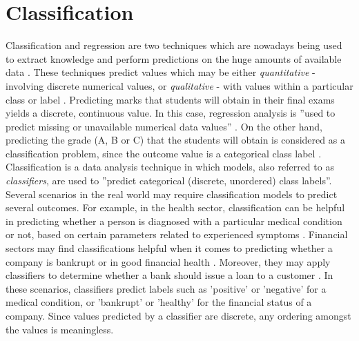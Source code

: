 \chapter[Classification]{Classification}
\label{ch:classification}

Classification and regression are two techniques which are nowadays being used to extract knowledge and perform predictions on the huge amounts of available data \citep{sagar2017}. These techniques predict values which may be either \textit{quantitative} - involving discrete numerical values, or \textit{qualitative} - with values within a particular class or label \citep{james2006}. Predicting marks that students will obtain in their final exams yields a discrete, continuous value. In this case, regression analysis is ''used to predict missing or unavailable numerical data values'' \citep{jiawei2011}. On the other hand, predicting the grade (A, B or C) that the students will obtain is considered as a classification problem, since the outcome value is a categorical class label \citep{jiawei2011}.\\

Classification is a data analysis technique in which models, also referred to as \textit{classifiers}, are used to ''predict categorical (discrete, unordered) class labels''. Several scenarios in the real world may require classification models to predict several outcomes. For example, in the health sector, classification can be helpful in predicting whether a person is diagnosed with a particular medical condition or not, based on certain parameters related to experienced symptoms \citep{venkata2011,alzahani2015}. Financial sectors may find classifications helpful when it comes to predicting whether a company is bankrupt or in good financial health \citep{moradi2012}. Moreover, they may apply classifiers to determine whether a bank should issue a loan to a customer \citep{thomas2000}. In these scenarios, classifiers predict labels such as 'positive' or 'negative' for a medical condition, or 'bankrupt' or 'healthy' for the financial status of a company. Since values predicted by a classifier are discrete, any ordering amongst the values is meaningless. 

